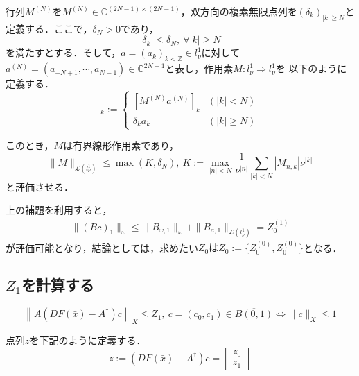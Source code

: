 \begin{lmm}
  行列$M^{(N)}$を$M^{(N)} \in \mathbb{C}^{(2N-1) \times (2N-1)}$，双方向の複素無限点列を$(\delta_k)_{|k| \geq N}$と定義する．ここで，$\delta_N > 0$であり，
  \begin{equation*}
    |\delta_k| \leq \delta_N,\ \forall |k| \geq N
  \end{equation*}
  を満たすとする．そして，$a=(a_k)_{k<\mathbb{Z}} \in l_\nu^1$に対して$a^{(N)}=(a_{-N+1},\cdots,a_{N-1})\in \mathbb{C}^{2N-1}$と表し，作用素$M:l_\nu^1 \Rightarrow l_\nu^1$を
  以下のように定義する．
  \begin{equation*}
    [Ma]_k := \begin{cases}
      [M^{(N)}a^{(N)}]_k & (|k|<N)     \\
      \delta_k a_k       & (|k|\geq N)
    \end{cases}
  \end{equation*}

  このとき，$M$は有界線形作用素であり，
  \begin{equation*}
    \|M\|_{\mathcal{L}(l_\nu^1)} \leq \max \left( K,\delta_N \right),\ K:=\max_{|n|<N} \frac{1}{\nu^{|n|}} \sum_{|k|<N} |M_{n,k}| \nu^{|k|}
  \end{equation*}
  と評価させる．
\end{lmm}

上の補題を利用すると，
\begin{eqnarray}
  \|(Bc)_1\|_\omega \leq \|B_{\omega,1}\|_\omega + \|B_{a,1}\|_{\mathcal{L}(l_\nu^1)} = Z_0^{(1)}
\end{eqnarray}
が評価可能となり，結論としては，求めたい$Z_0はZ_0:=\{Z_0^{(0)},Z_0^{(0)}\}$となる．

\subsection{$Z_1$を計算する}
\begin{equation*}
  \left\| A \left( DF \left( \bar{x} \right) - A^\dagger \right) c \right\|_X \leq Z_1,\ c=(c_0,c_1) \in \overline{B(0,1)} \Leftrightarrow \|c\|_X \leq 1
\end{equation*}

点列$z$を下記のように定義する．
\begin{equation}
  z := \left(DF(\bar{x})-A^\dagger\right)c = \begin{bmatrix}
    z_0 \\
    z_1
  \end{bmatrix}
\end{equation}

